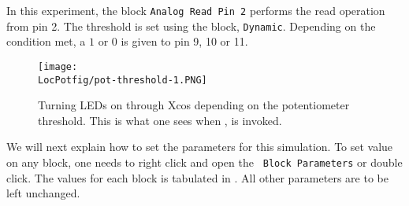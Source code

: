 In this experiment, the block {\tt Analog Read Pin 2} performs the read 
operation from pin 2. The threshold is set using the block, {\tt Dynamic}. 
Depending on the condition met, a $1$ or $0$ is given to pin 9, 10 or 11.

\begin{figure}
  \centering
  \texttt{[image: \\LocPotfig/pot-threshold-1.PNG]}
  \caption[Turning LEDs on through Xcos depending on the potentiometer
  threshold]{Turning LEDs on through Xcos depending on the
    potentiometer threshold.  This is what one sees when
      , is invoked.}
  \label{fig:pot-threshold}
\end{figure}

We will next explain how to set the parameters for this simulation.
To set value on any block, one needs to right click and open the {\tt
  Block Parameters} or double click.  The values for each block is
tabulated in .  All other parameters are to
be left unchanged.
